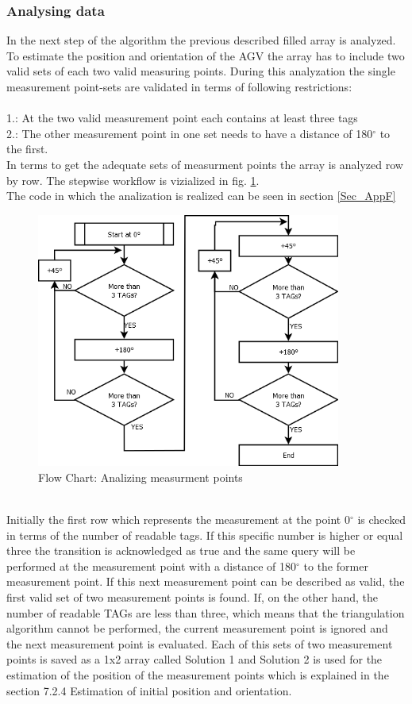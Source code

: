 \subsubsection{Analysing data}
In the next step of the algorithm the previous described filled array is analyzed. To estimate the position and orientation of the AGV the array has to include two valid sets of each two valid measuring points.  During this analyzation the single measurement point-sets are validated in terms of following restrictions:\\\\
1.: At the two valid measurement point each contains at least three tags\\
2.: The other measurement point in one set needs to have a distance of 180$^\circ$  to the first.
\pagebreak\\
In terms to get the adequate sets of measurment points the array is analyzed row by row. The stepwise workflow is vizialized in fig. \ref{Analyze_Array}.\\
The code in which the analization is realized can be seen in section \ref{Sec_AppF}
\begin{figure}[!htbp]
\centering
\includegraphics[width = 10cm]{Pictures/AnalyzeArray}
\caption{Flow Chart: Analizing measurment points}
\label{Analyze_Array}
\end{figure}\\
Initially the first row which represents the measurement at the point 0$^\circ$ is checked in terms of the number of readable tags. If this specific number is higher or equal three the transition is acknowledged as true and the same query will be performed at the measurement point with a distance of 180$^\circ$ to the former measurement point. If this next measurement point can be described as valid, the first valid set of two measurement points is found. If, on the other hand, the number of readable TAGs are less than three, which means that the triangulation algorithm cannot be performed, the current measurement point is ignored and the next measurement point is evaluated.
Each of this sets of two measurement points is saved as a 1x2 array called Solution 1 and Solution 2 is used for the estimation of the position of the measurement points which is explained in the section 7.2.4 Estimation of initial position and orientation.\\
%


